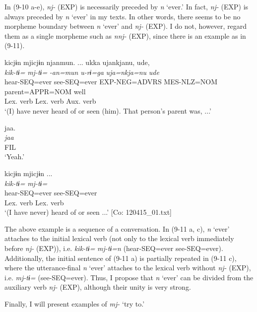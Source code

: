 In (9-10 a-e), \textit{nj-} (EXP) is necessarily preceded by \textit{n} ‘ever.’ In fact, \textit{nj-} (EXP) is always preceded by \textit{n} ‘ever’ in my texts. In other words, there seems to be no morpheme boundary between \textit{n} ‘ever’ and \textit{nj-} (EXP). I do not, however, regard them as a single morpheme such as \textit{nnj-} (EXP), since there is an example as in (9-11).

\ea    \label{ex:9.11}
\ea\label{ex:9.11a} %
     \gllll kicjɨn  mjicjɨn  njanmun.  ...  ukka  ujankjanu,  ude,\\
      \textit{kik-tɨ=}  \textit{mj-tɨ=}  \textit{-an=mun}    \textit{u-rɨ=ga}    \textit{uja=nkja=nu}  \textit{ude}\\
      hear-SEQ=ever  see-SEQ=ever  EXP-NEG=ADVRS    MES-NLZ=NOM  parent=APPR=NOM  well\\
      {Lex. verb}  {Lex. verb}  {Aux. verb}\\
    \glt      ‘(I) have never heard of or seen (him). That person’s parent was, ...’

\ex\label{ex:9.11b} %
      \glll jaa.\\
      \textit{jaa}\\
      FIL\\
    \glt  ‘Yeah.’  

\ex \label{ex:9.11c} %
     \gllll     kicjɨn  mjicjɨn  ...  \\
      \textit{kik-tɨ=}  \textit{mj-tɨ=}    \\
      hear-SEQ=ever  see-SEQ=ever    \\
      {Lex. verb}  {Lex. verb}    \\
      \glt       ‘(I have never) heard of or seen ...’   [Co: 120415\_01.txt]
    \z
\z

The above example is a sequence of a conversation. In (9-11 a, c), \textit{n} ‘ever’ attaches to the initial lexical verb (not only to the lexical verb immediately before \textit{nj-} (EXP)), i.e. \textit{kik-tɨ=} \textit{mj-tɨ=n} (hear-SEQ=ever see-SEQ=ever). Additionally, the initial sentence of (9-11 a) is partially repeated in (9-11 c), where the utterance-final \textit{n} ‘ever’ attaches to the lexical verb without \textit{nj-} (EXP), i.e. \textit{mj-tɨ=} (see-SEQ=ever). Thus, I propose that \textit{n} ‘ever’ can be divided from the auxiliary verb \textit{nj-} (EXP), although their unity is very strong.

  Finally, I will present examples of \textit{mj-} ‘try to.’


